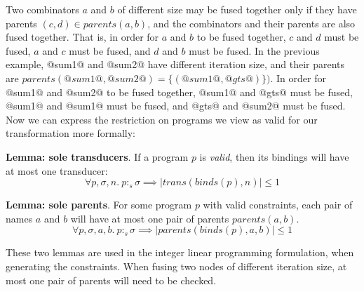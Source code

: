 Two combinators $a$ and $b$ of different size may be fused together only if they have parents $(c, d) \in parents(a,b)$, and the combinators and their parents are also fused together.
That is, in order for $a$ and $b$ to be fused together, $c$ and $d$ must be fused, $a$ and $c$ must be fused, and $d$ and $b$ must be fused.
In the previous example, @sum1@ and @sum2@ have different iteration size, and their parents are $parents(@sum1@, @sum2@) = \{(@sum1@, @gts@)\})$.
In order for @sum1@ and @sum2@ to be fused together, @sum1@ and @gts@ must be fused, @sum1@ and @sum1@ must be fused, and @gts@ and @sum2@ must be fused. Now we can express the restriction on programs we view as valid for our transformation more formally:

\textbf{Lemma: sole transducers}.
If a program $p$ is \emph{valid}, then its bindings will have at most one transducer:
\[
\forall p, \sigma, n.\ p :_s \sigma \implies |trans(binds(p), n)| \le 1
\]

 
\textbf{Lemma: sole parents}.
For some program $p$ with valid constraints, each pair of names $a$ and $b$ will have at most one pair of parents $parents(a,b)$.
\[
\forall p, \sigma, a, b.\ p :_s \sigma \implies |parents(binds(p), a, b)| \le 1
\]

These two lemmas are used in the integer linear programming formulation, when generating the constraints.
When fusing two nodes of different iteration size, at most one pair of parents will need to be checked.

